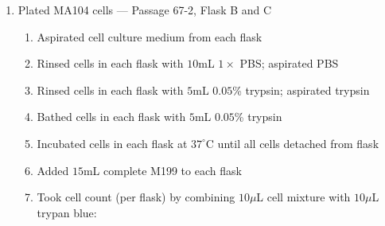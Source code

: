 \begin{enumerate}
	\item Plated MA104 cells --- Passage 67-2, Flask B and C
		\begin{enumerate}
			\item Aspirated cell culture medium from each flask
			\item Rinsed cells in each flask with $10$mL $1\times$ PBS; aspirated PBS
			\item Rinsed cells in each flask with $5$mL $0.05$\% trypsin; aspirated trypsin
			\item Bathed cells in each flask with $5$mL $0.05$\% trypsin
			\item Incubated cells in each flask at $37^{\circ}$C until all cells detached from flask
			\item Added $15$mL complete M199 to each flask
			\item Took cell count (per flask) by combining $10\mu$L cell mixture with $10\mu$L trypan blue:
			

\end{enumerate}
\end{enumerate}
